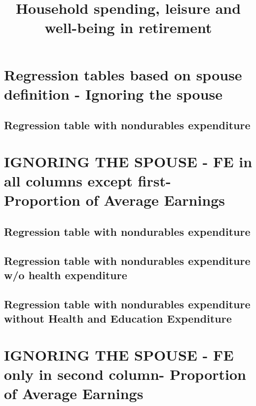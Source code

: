 \documentclass[a4paper,landscape]{article}
\begin{document}
	
	\title{Household spending, leisure and well-being in retirement}
	\date{}
	\maketitle
	
\section{Regression tables based on spouse definition - Ignoring the spouse}
\subsection{Regression table with nondurables expenditure}

\clearpage

\section{IGNORING THE SPOUSE - FE in all columns except first- Proportion of Average Earnings}

\subsection{Regression table with nondurables expenditure }

\clearpage

\subsection{Regression table with nondurables expenditure w/o health expenditure} 

\clearpage

\subsection{Regression table with nondurables expenditure without Health and Education Expenditure}

\clearpage

\section{IGNORING THE SPOUSE - FE only in second column- Proportion of Average Earnings}
\end{document}
